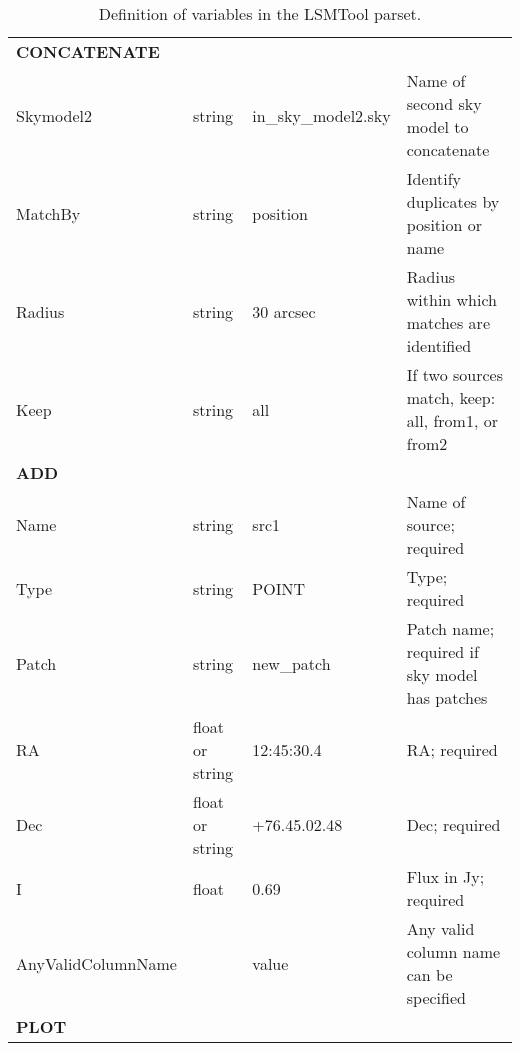 \documentclass[structabstract]{article}
\begin{document}
\begin{table}[!ht]
\begin{tabular}{l l l l}
\hline
\multicolumn{4}{l}{\textbf{CONCATENATE}}\\
Skymodel2 & string & in\_sky\_model2.sky & Name of second sky model to concatenate\\
MatchBy & string & position & Identify duplicates by position or name\\
Radius & string & 30 arcsec & Radius within which matches are identified\\
Keep & string & all & If two sources match, keep: all, from1, or from2\\
\hline
\multicolumn{4}{l}{\textbf{ADD}}\\
Name & string & src1 & Name of source; required\\
Type & string & POINT & Type; required\\
Patch & string & new\_patch & Patch name; required if sky model has patches\\
RA & float or string & 12:45:30.4 & RA; required\\
Dec & float or string & +76.45.02.48 & Dec; required\\
I & float & 0.69 & Flux in Jy; required\\
AnyValidColumnName & & value & Any valid column name can be specified\\
\hline
\multicolumn{4}{l}{\textbf{PLOT}}\\
\hline

\end{tabular}
\caption{Definition of variables in the LSMTool parset. \label{lsmtool:tab:local_val}}
\end{table}

\end{document}
